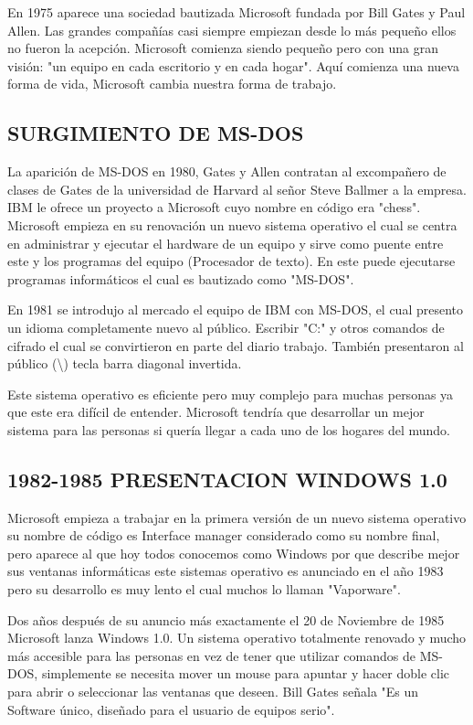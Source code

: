 En 1975 aparece una sociedad bautizada Microsoft fundada por  Bill Gates y Paul Allen. Las grandes compañías casi siempre empiezan desde lo más pequeño ellos no fueron la 
acepción. Microsoft comienza siendo pequeño pero con una gran visión: "un equipo en cada escritorio y en cada hogar". Aquí comienza una nueva forma de vida, Microsoft 
cambia nuestra forma de trabajo.

\subsection*{SURGIMIENTO DE MS-DOS}
La aparición de MS-DOS en 1980, Gates y Allen contratan al excompañero de clases de Gates de la universidad de Harvard al señor Steve Ballmer a la empresa. IBM le ofrece 
un proyecto a Microsoft cuyo nombre en código era "chess". Microsoft empieza en su renovación un nuevo sistema operativo el cual se centra en administrar y ejecutar el 
hardware de un equipo y sirve como puente entre este y los programas del equipo (Procesador de texto). En este puede ejecutarse programas informáticos el cual es bautizado 
como "MS-DOS".
 
En 1981 se introdujo al mercado el equipo de IBM con MS-DOS, el cual presento un idioma completamente nuevo al público. Escribir "C:" y otros comandos de cifrado el cual se 
convirtieron en parte del diario trabajo. También presentaron al público (\textbackslash) tecla barra diagonal invertida.
 
Este sistema operativo es eficiente pero muy complejo para muchas personas ya que este era difícil de entender. Microsoft tendría que desarrollar un mejor sistema para las 
personas si quería llegar a cada uno de los hogares del mundo.

\subsection*{1982-1985 PRESENTACION WINDOWS 1.0}
Microsoft empieza a trabajar en la primera versión de un nuevo sistema operativo su nombre de código es Interface manager considerado como su nombre final, pero aparece al 
que hoy todos conocemos como Windows por que describe mejor sus ventanas informáticas este sistemas operativo es anunciado en el año 1983 pero su desarrollo es muy lento el 
cual muchos lo llaman "Vaporware".
 
Dos años después de su anuncio más exactamente el 20 de Noviembre de 1985 Microsoft lanza Windows 1.0. Un sistema operativo totalmente renovado y mucho más accesible para 
las personas en vez de tener que utilizar comandos de MS-DOS, simplemente se  necesita mover un mouse para apuntar y hacer doble clic para abrir o seleccionar las ventanas 
que deseen. Bill Gates señala "Es un Software único, diseñado para el usuario de equipos serio".
 
